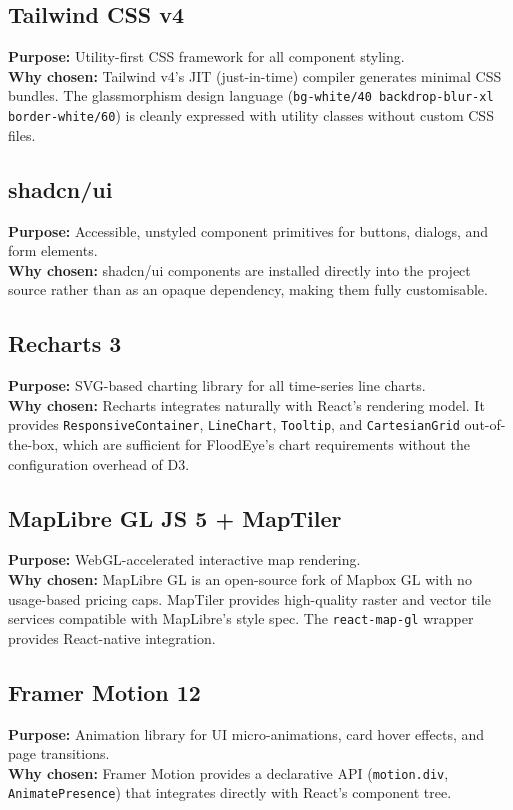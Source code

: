 \subsection{Tailwind CSS v4}
\textbf{Purpose:} Utility-first CSS framework for all component styling.\\
\textbf{Why chosen:} Tailwind v4's JIT (just-in-time) compiler generates minimal CSS bundles. The glassmorphism design language (\texttt{bg-white/\allowbreak{}40 backdrop-blur-xl border-white/\allowbreak{}60}) is cleanly expressed with utility classes without custom CSS files.

\subsection{shadcn/ui}
\textbf{Purpose:} Accessible, unstyled component primitives for buttons, dialogs, and form elements.\\
\textbf{Why chosen:} shadcn/ui components are installed directly into the project source rather than as an opaque dependency, making them fully customisable.

\subsection{Recharts 3}
\textbf{Purpose:} SVG-based charting library for all time-series line charts.\\
\textbf{Why chosen:} Recharts integrates naturally with React's rendering model. It provides \texttt{ResponsiveContainer}, \texttt{LineChart}, \texttt{Tooltip}, and \texttt{CartesianGrid} out-of-the-box, which are sufficient for FloodEye's chart requirements without the configuration overhead of D3.

\subsection{MapLibre GL JS 5 + MapTiler}
\textbf{Purpose:} WebGL-accelerated interactive map rendering.\\
\textbf{Why chosen:} MapLibre GL is an open-source fork of Mapbox GL with no usage-based pricing caps. MapTiler provides high-quality raster and vector tile services compatible with MapLibre's style spec. The \texttt{react-map-gl} wrapper provides React-native integration.

\subsection{Framer Motion 12}
\textbf{Purpose:} Animation library for UI micro-animations, card hover effects, and page transitions.\\
\textbf{Why chosen:} Framer Motion provides a declarative API (\texttt{motion.\allowbreak{}div}, \texttt{AnimatePresence}) that integrates directly with React's component tree.

